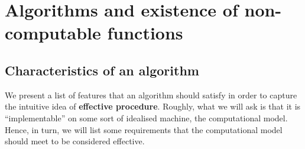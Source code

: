 \chapter{Algorithms and existence of non-computable functions}

\section{Characteristics of an algorithm}
\label{se:alg-char}

We present a list of features that an algorithm should satisfy in
order to capture the intuitive idea of \textbf{effective procedure}. Roughly,
what we will ask is that it is ``implementable'' on some sort of
idealised machine, the computational model. Hence, in turn, we will
list some requirements that the computational model should meet to be
considered effective.

